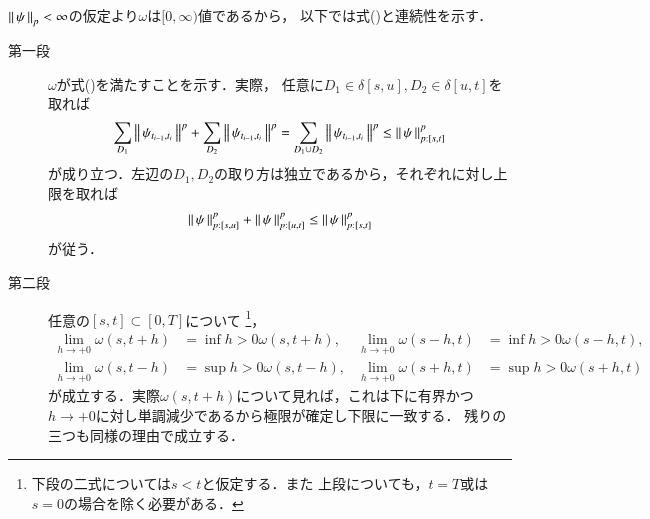 	\begin{prf}
		$\left\|\, \psi\, \right\|_{p} < \infty$の仮定より$\omega$は$[0,\infty)$値であるから，
		以下では式()と連続性を示す．
		\begin{description}
			\item[第一段]
				$\omega$が式()を満たすことを示す．実際，
				任意に$D_1 \in \delta[s,u],D_2 \in \delta[u,t]$を取れば
				\begin{align}
					\sum_{D_1}\left\|\, \psi_{t_{i-1},t_i}\, \right\|_{}^p
					+ \sum_{D_2}\left\|\, \psi_{t_{i-1},t_i}\, \right\|_{}^p
					= \sum_{D_1 \cup D_2}\left\|\, \psi_{t_{i-1},t_i}\, \right\|_{}^p
					\leq \left\|\, \psi\, \right\|_{p:[s,t]}^p
				\end{align}
				が成り立つ．左辺の$D_1,D_2$の取り方は独立であるから，それぞれに対し上限を取れば
				\begin{align}
					\left\|\, \psi\, \right\|_{p:[s,u]}^p + \left\|\, \psi\, \right\|_{p:[u,t]}^p
					\leq \left\|\, \psi\, \right\|_{p:[s,t]}^p
				\end{align}
				が従う．
			\item[第二段]
				任意の$[s,t] \subset [0,T]$について
				\footnote{
					下段の二式については$s < t$と仮定する．また
					上段についても，$t=T$或は$s=0$の場合を除く必要がある．
				}，
				\begin{align}
					\lim_{h \to +0} \omega(s,t+h) &= \inf{h>0}{\omega(s,t+h)},
					&\lim_{h \to +0} \omega(s-h,t) &= \inf{h>0}{\omega(s-h,t)}, \\
					\lim_{h \to +0} \omega(s,t-h) &= \sup{h>0}{\omega(s,t-h)},
					&\lim_{h \to +0} \omega(s+h,t) &= \sup{h>0}{\omega(s+h,t)}
				\end{align}
				が成立する．実際$\omega(s,t+h)$について見れば，これは下に有界かつ
				$h \to +0$に対し単調減少であるから極限が確定し下限に一致する．
				残りの三つも同様の理由で成立する．
				

\end{description}
\end{prf}
